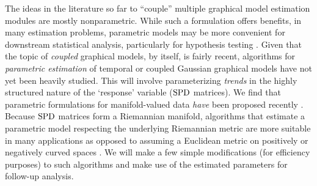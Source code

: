 The ideas in the literature so far to ``couple'' multiple graphical model estimation modules are mostly nonparametric. 
While such a formulation offers benefits, in many estimation problems, 
parametric models may 
be more convenient for downstream statistical analysis,
particularly for hypothesis testing \citep{hardle1993comparing,geer2000empirical,roehrig1988conditions}.
Given that the topic of \textit{coupled} graphical models, by itself, is fairly recent, algorithms for {\em parametric estimation} of 
temporal or coupled Gaussian graphical models have not yet been heavily studied. 
This will involve parameterizing {\em trends} in the highly structured nature of the `response' variable ($\text{SPD}$ matrices). 
We find that parametric formulations for manifold-valued data {\em have} been proposed recently \citep{hjkimcvpr2014,cornea2016regression}. %
Because $\text{SPD}$ matrices form a Riemannian manifold, algorithms
that estimate a parametric model respecting the underlying Riemannian metric are more suitable in many applications as opposed to assuming a Euclidean metric 
on positively or negatively curved spaces \citep{xie2010statistical, fletcher2007riemannian, jayasumanakernel}. We will make a few simple modifications 
(for efficiency purposes) to such algorithms and make use of the estimated parameters for follow-up analysis.


